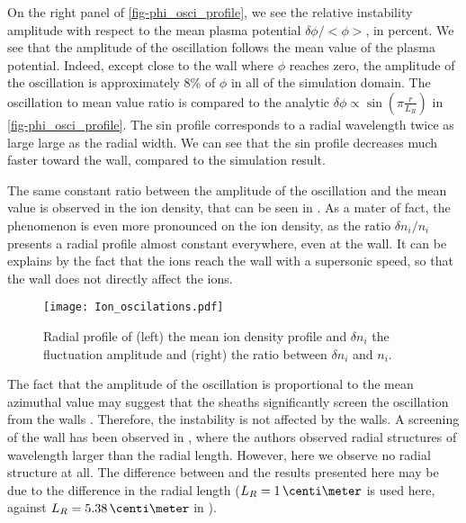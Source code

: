   On the right panel of \cref{fig-phi_osci_profile}, we see the relative instability amplitude with respect to the mean plasma potential $\delta\phi / <\phi>$, in percent.
  We see that the amplitude of the oscillation follows the mean value of the plasma potential.
  Indeed, except close to the wall where $\phi$ reaches zero, the amplitude of the oscillation is approximately 8\% of $\phi$ in all of the simulation domain.
  The oscillation to mean value ratio is compared to the analytic $\delta \phi \propto \sin( \pi \frac{r}{L_R})$ in \cref{fig-phi_osci_profile}.
  The sin profile corresponds to a radial wavelength twice as large large as the radial width.
  We can see that the sin profile decreases much faster toward the wall, compared to the simulation result.
  
  

  The same constant ratio between the amplitude of the oscillation and the mean value is observed in the ion density, that can be seen in .
  As a mater of fact, the phenomenon is even more pronounced on the ion density, as the ratio $\delta n_i / n_i$ presents a radial profile almost constant everywhere, even at the wall.
  It can be explains by the fact that the ions reach the wall with a supersonic speed, so that the wall does not directly affect the ions.
  
  
  \begin{figure}[!hbt]
    \centering
    \texttt{[image: Ion\_oscilations.pdf]}
    \caption{Radial profile of (left) the mean ion density profile and $\delta n_i$ the fluctuation amplitude and (right) the ratio between $\delta n_i$ and $n_i$.}
    \label{fig-ion_oscilation}
  \end{figure}
  
  \vspace{1em}
  The fact that the amplitude of the oscillation is proportional to the mean azimuthal value may suggest that the sheaths significantly  screen  the oscillation from the walls .
  Therefore, the instability is not affected by the walls.
  A screening of the wall has been observed in \citet{janhunen2018}, where the authors observed radial structures of wavelength larger than the radial length.
  However, here we observe no radial structure at all.
  The difference between  \citet{janhunen2018} and the results presented here may be due to the difference in the radial length ($L_R =1 \,\centi\meter$ is used here, against $L_R = 5.38\,\centi\meter$ in \citet{janhunen2018} ).
  
